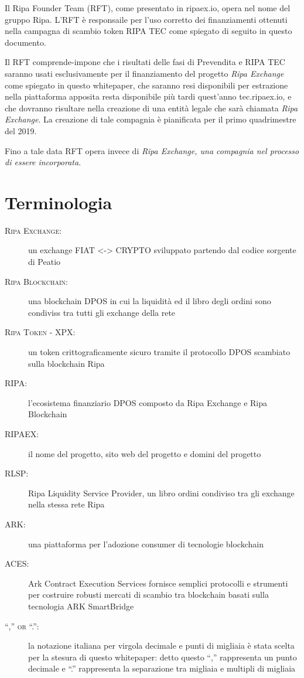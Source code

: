 \documentclass[11pt,fleqn,oneside]{book} %
\begin{document}
Il Ripa Founder Team (RFT), come presentato in ripaex.io, opera nel nome del gruppo Ripa. L'RFT è responsaile per l'uso corretto dei finanziamenti
ottenuti nella campagna di scambio token RIPA TEC come spiegato di seguito in questo documento.

Il RFT comprende-impone che i risultati delle fasi di Prevendita e RIPA TEC saranno usati esclusivamente per il finanziamento del progetto 
\emph{Ripa Exchange} come spiegato in questo whitepaper, che saranno resi disponibili per estrazione nella piattaforma apposita resta disponibile
più tardi quest'anno tec.ripaex.io, e che dovranno risultare nella creazione di una entità legale che sarà chiamata \emph{Ripa Exchange}. La creazione di tale 
compagnia è pianificata per il primo quadrimestre del 2019.

Fino a tale data RFT opera invece di \emph{Ripa Exchange, una compagnia nel processo di essere incorporata}.





\section{Terminologia}
\begin{description}
	\item[\textsc{Ripa Exchange:}] un exchange FIAT <-> CRYPTO sviluppato partendo dal codice sorgente di Peatio \cite{peatio}
	\item[\textsc{Ripa Blockchain:}] una blockchain DPOS in cui la liquidità ed il libro degli ordini sono condiviss tra tutti gli exchange della rete
	\item[\textsc{Ripa Token - XPX:}] un token crittograficamente sicuro tramite il protocollo DPOS scambiato sulla blockchain Ripa 
	\item[\textsc{RIPA:}] l'ecosistema finanziario DPOS composto da Ripa Exchange e Ripa Blockchain
	\item[\textsc{RIPAEX:}] il nome del progetto, sito web del progetto e domini del progetto
    \item[\textsc{RLSP:}] Ripa Liquidity Service Provider, un libro ordini condiviso tra gli exchange nella stessa rete Ripa
	\item[\textsc{ARK:}] una piattaforma per l'adozione consumer di tecnologie blockchain \cite{ark}
	\item[\textsc{ACES:}] Ark Contract Execution Services \cite{aces} fornisce semplici protocolli e strumenti per costruire robusti
	mercati di scambio tra blockchain basati sulla tecnologia ARK SmartBridge
	\item[\textsc{“,” or “.”:}] la notazione italiana per virgola decimale e punti di migliaia è stata scelta per la stesura di questo 
	whitepaper: detto questo “,” rappresenta un punto decimale e “.” rappresenta la separazione tra migliaia e multipli di migliaia 
\end{description}
\end{document}
